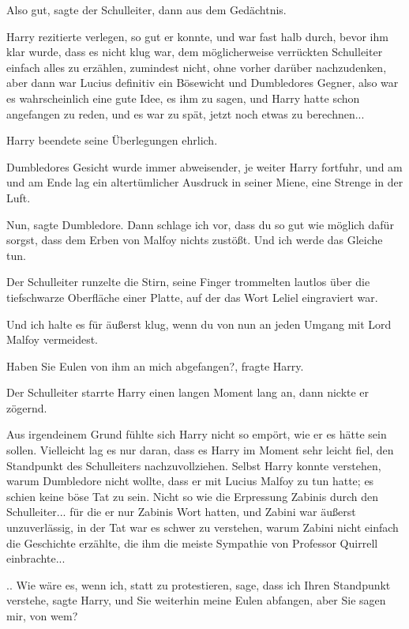 \glqq Also gut\grqq{}, sagte der Schulleiter, \glqq dann aus dem
Gedächtnis.\grqq{}

Harry rezitierte verlegen, so gut er konnte, und war fast halb durch, bevor ihm
klar wurde, dass es nicht klug war, dem möglicherweise verrückten Schulleiter
einfach alles zu erzählen, zumindest nicht, ohne vorher darüber nachzudenken,
aber dann war Lucius definitiv ein Bösewicht und Dumbledores Gegner, also war es
wahrscheinlich eine gute Idee, es ihm zu sagen, und Harry hatte schon angefangen
zu reden, und es war zu spät, jetzt noch etwas zu berechnen...

Harry beendete seine Überlegungen ehrlich.

Dumbledores Gesicht wurde immer abweisender, je weiter Harry fortfuhr, und am
und am Ende lag ein altertümlicher Ausdruck in seiner Miene, eine Strenge in der
Luft.

\glqq Nun\grqq{}, sagte Dumbledore. \glqq Dann schlage ich vor, dass du so gut
wie möglich dafür sorgst, dass dem Erben von Malfoy nichts zustößt. Und ich
werde das Gleiche tun.\grqq{}

Der Schulleiter runzelte die Stirn, seine Finger trommelten lautlos über die
tiefschwarze Oberfläche einer Platte, auf der das Wort Leliel eingraviert war.

\glqq Und ich halte es für äußerst klug, wenn du von nun an jeden Umgang mit
Lord Malfoy vermeidest.\grqq{}

\glqq Haben Sie Eulen von ihm an mich abgefangen?\grqq{}, fragte Harry.

Der Schulleiter starrte Harry einen langen Moment lang an, dann nickte er
zögernd.

Aus irgendeinem Grund fühlte sich Harry nicht so empört, wie er es hätte sein
sollen. Vielleicht lag es nur daran, dass es Harry im Moment sehr leicht fiel,
den Standpunkt des Schulleiters nachzuvollziehen. Selbst Harry konnte verstehen,
warum Dumbledore nicht wollte, dass er mit Lucius Malfoy zu tun hatte; es schien
keine böse Tat zu sein. Nicht so wie die Erpressung Zabinis durch den
Schulleiter... für die er nur Zabinis Wort hatten, und Zabini war äußerst
unzuverlässig, in der Tat war es schwer zu verstehen, warum Zabini nicht einfach
die Geschichte erzählte, die ihm die meiste Sympathie von Professor Quirrell
einbrachte...

.. \glqq Wie wäre es, wenn ich, statt zu protestieren, sage, dass ich Ihren
Standpunkt verstehe\grqq{}, sagte Harry, \glqq und Sie weiterhin meine Eulen
abfangen, aber Sie sagen mir, von wem?\grqq{}

